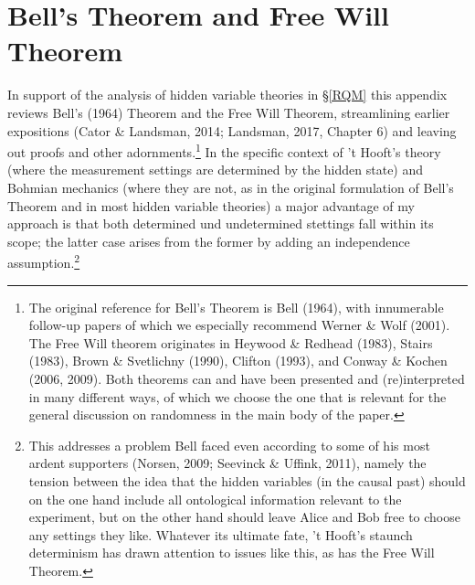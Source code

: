 \documentclass[12pt]{article}
\numberwithin{equation}{section}
\begin{document}
\section{Bell's Theorem and  Free Will Theorem}\label{FWT}
In support of the analysis of hidden variable theories in \S\ref{RQM} this appendix  reviews Bell's (1964) Theorem and the Free Will Theorem, streamlining earlier expositions  (Cator \&  Landsman, 2014;  Landsman, 2017, Chapter 6) and leaving out proofs and other adornments.\footnote{The original reference for Bell's Theorem is Bell (1964), with innumerable follow-up papers of which we especially recommend  Werner \& Wolf (2001). The Free Will theorem originates in  Heywood \& Redhead (1983), Stairs (1983),
 Brown \& Svetlichny (1990),  Clifton (1993), and Conway \& Kochen (2006, 2009). Both theorems can and have been presented and (re)interpreted in many different ways, of which we choose the one that is relevant for the general discussion on randomness in the main body of the paper. } 
 In the specific context of 't Hooft's theory (where the measurement settings are determined by the hidden state) and Bohmian mechanics (where they are not, as in the original formulation of Bell's Theorem and in most hidden variable theories) a major advantage of my approach is that both determined und undetermined stettings fall within its scope; the latter case arises from the former by adding an independence assumption.\footnote{
  This addresses a problem Bell faced even according to some of his most ardent supporters
(Norsen, 2009; Seevinck \& Uffink, 2011), namely the tension between the idea that the hidden variables (in the  causal past) should on the one hand include all ontological information relevant to the experiment, but on the other hand should leave Alice and Bob free to choose any settings they like. Whatever its ultimate fate, 't Hooft's staunch determinism has drawn attention to issues like this, as has the Free Will Theorem.}
\end{document}
